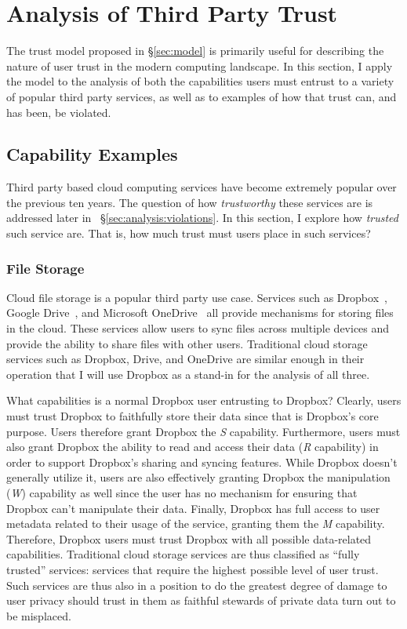 \section{Analysis of Third Party Trust}
\label{sec:analysis}

The trust model proposed in \S\ref{sec:model} is primarily useful for
describing the nature of user trust in the modern computing
landscape. In this section, I apply the model to the analysis of both
the capabilities users must entrust to a variety of popular third
party services, as well as to examples of how that trust can, and has
been, be violated.

\subsection{Capability Examples}
\label{sec:analysis:capabilities}

Third party based cloud computing services have become extremely
popular over the previous ten years.  The question of how
\textit{trustworthy} these services are is addressed later in
~\S\ref{sec:analysis:violations}. In this section, I explore how
\textit{trusted} such service are. That is, how much trust must users
place in such services?

\subsubsection{File Storage}

Cloud file storage is a popular third party use case. Services such as
Dropbox~\cite{dropbox}, Google Drive~\cite{google-drive}, and
Microsoft OneDrive~\cite{microsoft-onedrive} all provide mechanisms
for storing files in the cloud. These services allow users to sync
files across multiple devices and provide the ability to share files
with other users. Traditional cloud storage services such as Dropbox,
Drive, and OneDrive are similar enough in their operation that I will
use Dropbox as a stand-in for the analysis of all three.

What capabilities is a normal Dropbox user entrusting to Dropbox?
Clearly, users must trust Dropbox to faithfully store their data since
that is Dropbox's core purpose. Users therefore grant Dropbox the
\emph{S} capability. Furthermore, users must also grant Dropbox the
ability to read and access their data (\emph{R} capability) in order
to support Dropbox's sharing and syncing features. While Dropbox
doesn't generally utilize it, users are also effectively granting
Dropbox the manipulation (\emph{W}) capability as well since the user
has no mechanism for ensuring that Dropbox can't manipulate their
data. Finally, Dropbox has full access to user metadata related to
their usage of the service, granting them the \emph{M}
capability. Therefore, Dropbox users must trust Dropbox with all
possible data-related capabilities. Traditional cloud storage services
are thus classified as ``fully trusted'' services: services that
require the highest possible level of user trust. Such services are
thus also in a position to do the greatest degree of damage to user
privacy should trust in them as faithful stewards of private data turn
out to be misplaced.

